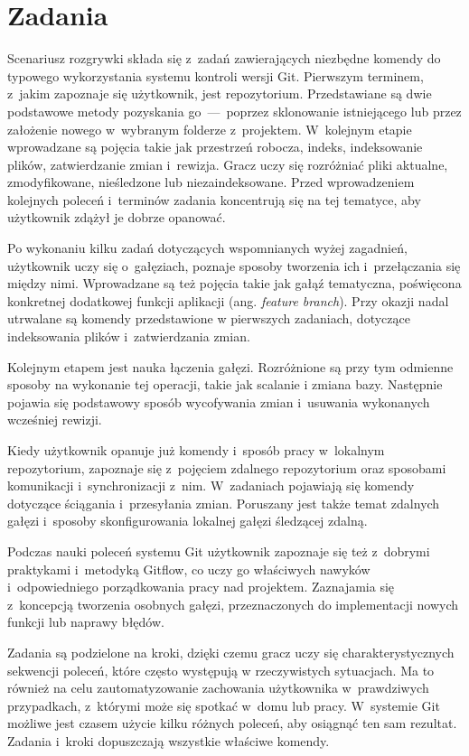 \documentclass[12pt,a4paper,polish,thesis]{dcsbook}
\begin{document}
{	\section{Zadania}
	
	Scenariusz rozgrywki składa się z~zadań zawierających niezbędne komendy do typowego wykorzystania systemu kontroli wersji Git. Pierwszym terminem, z~jakim zapoznaje się użytkownik, jest repozytorium. Przedstawiane są dwie podstawowe metody pozyskania go~---~poprzez sklonowanie istniejącego lub przez założenie nowego w~wybranym folderze z~projektem. W~kolejnym etapie wprowadzane są pojęcia takie jak przestrzeń robocza, indeks, indeksowanie plików, zatwierdzanie zmian i~rewizja. Gracz uczy się rozróżniać pliki aktualne, zmodyfikowane, nieśledzone lub niezaindeksowane. Przed wprowadzeniem kolejnych poleceń i~terminów zadania koncentrują się na tej tematyce, aby użytkownik zdążył je dobrze opanować. 
	
	Po wykonaniu kilku zadań dotyczących wspomnianych wyżej zagadnień, użytkownik uczy się o~gałęziach, poznaje sposoby tworzenia ich i~przełączania się między nimi. Wprowadzane są też pojęcia takie jak gałąź tematyczna, poświęcona konkretnej dodatkowej funkcji aplikacji (ang. \textit{feature branch}). Przy okazji nadal utrwalane są komendy przedstawione w pierwszych zadaniach, dotyczące indeksowania plików i~zatwierdzania zmian. 

	Kolejnym etapem jest nauka łączenia gałęzi. Rozróżnione są przy tym odmienne sposoby na wykonanie tej operacji, takie jak scalanie i zmiana bazy. Następnie pojawia się podstawowy sposób wycofywania zmian i~usuwania wykonanych wcześniej rewizji.

	Kiedy użytkownik opanuje już komendy i~sposób pracy w~lokalnym repozytorium, zapoznaje się z~pojęciem zdalnego repozytorium oraz sposobami komunikacji i~synchronizacji z~nim. W~zadaniach pojawiają się komendy dotyczące ściągania i~przesyłania zmian. Poruszany jest także temat zdalnych gałęzi i~sposoby skonfigurowania lokalnej gałęzi śledzącej zdalną.
	
	Podczas nauki poleceń systemu Git użytkownik zapoznaje się też z~dobrymi praktykami i~metodyką Gitflow, co uczy go właściwych nawyków i~odpowiedniego porządkowania pracy nad projektem. Zaznajamia się z~koncepcją tworzenia osobnych gałęzi, przeznaczonych do implementacji nowych funkcji lub naprawy błędów.
	
	Zadania są podzielone na kroki, dzięki czemu gracz uczy się charakterystycznych sekwencji poleceń, które często występują w rzeczywistych sytuacjach. Ma to również na celu zautomatyzowanie zachowania użytkownika w~prawdziwych przypadkach, z~którymi może się spotkać w~domu lub pracy. W~systemie Git możliwe jest czasem użycie kilku różnych poleceń, aby osiągnąć ten sam rezultat. Zadania i~kroki dopuszczają wszystkie właściwe komendy.
	
}
\end{document}
